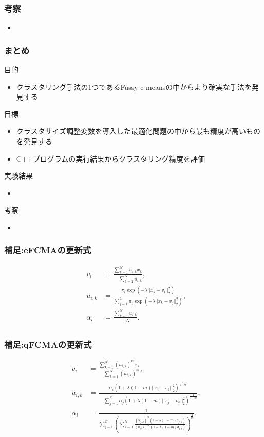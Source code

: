 \documentclass[13pt,dvipdfmx]{beamer}
\begin{document}
\begin{frame}\frametitle{考察}
\begin{itemize}
\item 
\end{itemize}
\end{frame}

\begin{frame}\frametitle{まとめ}
  \begin{block}{目的}
    \begin{itemize}
    \item クラスタリング手法の1つであるFussy c-meansの中からより確実な手法を発見する
    \end{itemize}
  \end{block}
  \begin{block}{目標}
    \begin{itemize}
     \item クラスタサイズ調整変数を導入した最適化問題の中から最も精度が高いものを発見する
     \item C++プログラムの実行結果からクラスタリング精度を評価
    \end{itemize}
  \end{block}
  \begin{block}{実験結果}
    \begin{itemize}
    \item 
    \end{itemize}
  \end{block}
  \begin{block}{考察}
      \begin{itemize}
    \item 
    \end{itemize}
  \end{block}
\end{frame}

\begin{frame}\frametitle{補足:eFCMAの更新式}
   \begin{eqnarray*}
   &v_{i}& =\frac{\sum_{k=1}^Nu_{i,k}x_{k}}{\quad\sum_{k=1}^Nu_{i,k}},\\
   &u_{i,k}&=\frac{\pi_{i}\exp(-\lambda||x_k-v_i||_2^2)}{\sum_{j=1}^C\pi_{j}\exp(-\lambda||x_k-v_j||_2^2)},\\
   &\alpha_{i}&=\frac{\sum_{k=1}^Nu_{i,k}}{\quad N}.\\
   \end{eqnarray*}
\end{frame}

\begin{frame}\frametitle{補足:qFCMAの更新式}
  \begin{eqnarray*}
    &v_{i}&=\frac{\sum_{k=1}^N(u_{i,k})^mx_{k}}{\quad\sum_{k=1}^N(u_{i,k})^{m}},\quad\\
    &u_{i,k}&=\frac{\alpha_{i}(1+\lambda(1-m)||x_i-v_k||_2^2)^\frac{1}{1-m}}{\quad\sum_{j=1}^C\alpha_{j}(1+\lambda(1-m)||x_j-v_k||_2^2)^\frac{1}{1-m}},\\
    & \alpha_{i}&=\frac{1}{\sum_{j=1}^C\left(\sum_{k=1}^N\frac{(u_{j,k})^m(1-\lambda(1-m)d_{j,k})}{(u_i,k)^m(1-\lambda(1-m)d_{i,k})}\right)^{\frac{1}{m}}}.\\
      \end{eqnarray*}
\end{frame}
\end{document}
